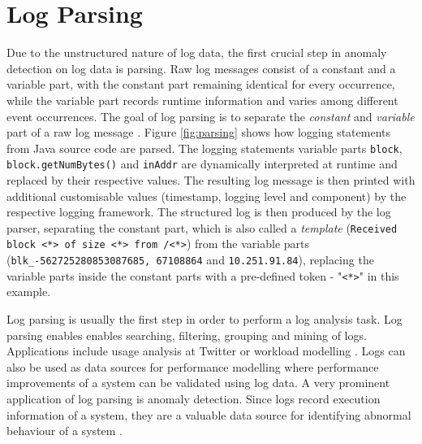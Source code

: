 \begin{comment}
Log messages are the result of the insertion of a variable part in a logging instruction (e.g. \textit{printf("Instance \%s shut down with errors, \%s)} in software code that is being output during execution. The constant parts can usually be found in source codes written by developers, while the variable parts are inserted dynamically during execution. As these logs are unstructured text, have to undergo certain pre-processing steps before they can be analysed for anomalies. Each log event can be parsed into a log template, leaving only the constant part, as it can be seen in figure \ref{fig:parsing}.
\end{comment}


\section{Log Parsing \label{sec:backgroundlogparsing}}
Due to the unstructured nature of log data, the first crucial step in anomaly detection on log data is parsing. Raw log messages consist of a constant and a variable part, with the constant part remaining identical for every occurrence, while the variable part records runtime information and varies among different event occurrences. The goal of log parsing is to separate the \textit{constant} and \textit{variable} part of a raw log message \cite{he2017towards}\cite{zhu2019tools}. Figure \ref{fig:parsing} shows how logging statements from Java source code are parsed. The logging statements variable parts \verb!block!, \verb!block.getNumBytes()! and \verb!inAddr! are dynamically interpreted at runtime and replaced by their respective values. The resulting log message is then printed with additional customisable values (timestamp, logging level and component) by the respective logging framework. The structured log is then produced by the log parser, separating the constant part, which is also called a \textit{template} (\verb!Received block <*> of size <*> from /<*>!) from the variable parts (\verb!blk_-562725280853087685, 67108864! and \verb!10.251.91.84!), replacing the variable parts inside the constant parts with a pre-defined token - "\verb!<*>!" in this example.

Log parsing is usually the first step in order to perform a log analysis task. Log parsing enables enables searching, filtering, grouping and mining of logs. Applications include usage analysis at Twitter \cite{lee2012unified} or workload modelling \cite{barham2004using}. Logs can also be used as data sources for performance modelling \cite{chow2014mystery} where performance improvements of a system can be validated using log data. A very prominent application of log parsing is anomaly detection. Since logs record execution information of a system, they are a valuable data source for identifying abnormal behaviour of a system \cite{zhu2019tools}.

